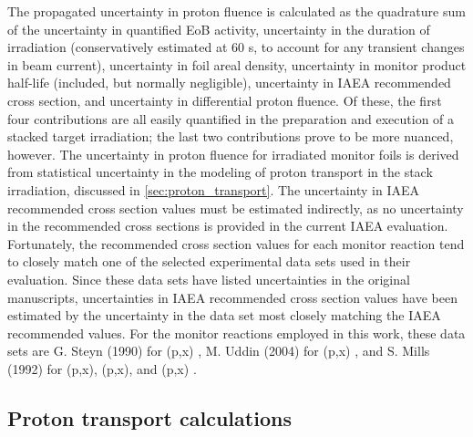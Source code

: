 \documentclass[3p]{elsarticle}
\begin{document}
The propagated uncertainty in proton fluence is calculated as the quadrature sum of the uncertainty in quantified EoB activity, uncertainty in the duration of irradiation (conservatively estimated at 60 s, to account for any transient changes in beam current), uncertainty in foil areal density, uncertainty in monitor product half-life (included, but normally negligible), uncertainty in IAEA recommended cross section, and uncertainty in differential proton fluence.
Of these, the first four contributions are all easily quantified in the preparation and execution of a stacked target irradiation;  the last two contributions prove to be more nuanced, however.
The uncertainty in proton fluence for irradiated monitor foils is derived from statistical uncertainty in the modeling of proton transport in the stack irradiation, discussed in \autoref{sec:proton_transport}.
The uncertainty in IAEA recommended cross section values must be estimated indirectly, as no uncertainty in the  recommended cross sections is provided in the current IAEA evaluation.
Fortunately, the recommended cross section values for each monitor reaction tend to closely match one of the   selected experimental data sets used in their evaluation.
Since these data sets have listed uncertainties in the original manuscripts, uncertainties in  IAEA recommended cross section values have been estimated by the uncertainty in the data set most closely matching the  IAEA recommended  values.
For the monitor reactions employed in this work, these data sets are G. Steyn (1990) for  (p,x) \cite{Steyn1990}, M. Uddin (2004) for (p,x) \cite{Uddin2004}, and S. Mills (1992) for (p,x), (p,x), and (p,x) \cite{Mills1992}.




\subsection{Proton transport calculations}\label{sec:proton_transport}
\end{document}
